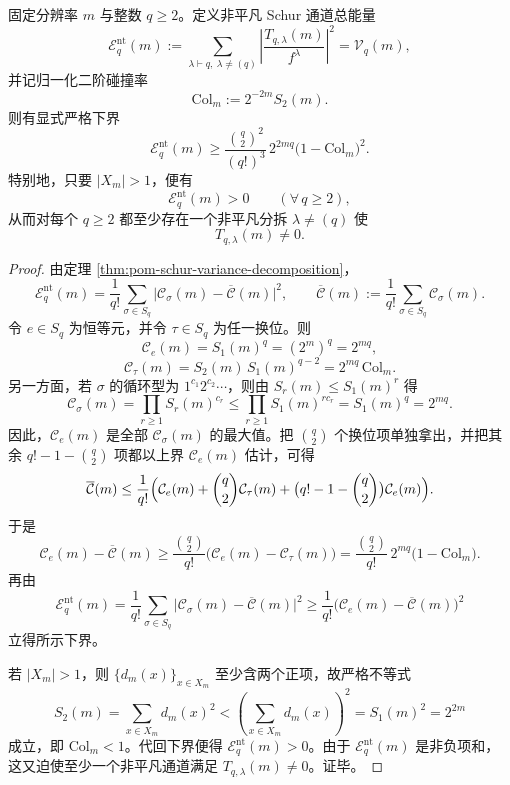 \begin{theorem}\label{thm:pom-schur-nontrivial-energy-explicit-lower-bound}
固定分辨率 \(m\) 与整数 \(q\ge 2\)。定义非平凡 Schur 通道总能量
\[
\mathcal E_q^{\mathrm{nt}}(m)
:=
\sum_{\lambda\vdash q,\ \lambda\neq(q)}
\left|\frac{T_{q,\lambda}(m)}{f^\lambda}\right|^2
=
\mathcal V_q(m),
\]
并记归一化二阶碰撞率
\[
\mathrm{Col}_m:=2^{-2m}S_2(m).
\]
则有显式严格下界
\[
\boxed{
\mathcal E_q^{\mathrm{nt}}(m)
\ge
\frac{\binom{q}{2}^2}{(q!)^3}\,2^{2mq}\bigl(1-\mathrm{Col}_m\bigr)^2.
}
\]
特别地，只要 \(|X_m|>1\)，便有
\[
\mathcal E_q^{\mathrm{nt}}(m)>0
\qquad(\forall\,q\ge 2),
\]
从而对每个 \(q\ge 2\) 都至少存在一个非平凡分拆 \(\lambda\neq(q)\) 使
\[
T_{q,\lambda}(m)\neq 0.
\]
\end{theorem}
\begin{proof}
由定理 \ref{thm:pom-schur-variance-decomposition}，
\[
\mathcal E_q^{\mathrm{nt}}(m)
=
\frac{1}{q!}\sum_{\sigma\in S_q}
\bigl|\mathcal C_\sigma(m)-\overline{\mathcal C}(m)\bigr|^2,
\qquad
\overline{\mathcal C}(m):=\frac{1}{q!}\sum_{\sigma\in S_q}\mathcal C_\sigma(m).
\]
令 \(e\in S_q\) 为恒等元，并令 \(\tau\in S_q\) 为任一换位。则
\[
\mathcal C_e(m)=S_1(m)^q=(2^m)^q=2^{mq},
\]
\[
\mathcal C_\tau(m)=S_2(m)\,S_1(m)^{q-2}=2^{mq}\,\mathrm{Col}_m.
\]
另一方面，若 \(\sigma\) 的循环型为 \(1^{c_1}2^{c_2}\cdots\)，则由 \(S_r(m)\le S_1(m)^r\) 得
\[
\mathcal C_\sigma(m)
=
\prod_{r\ge 1}S_r(m)^{c_r}
\le
\prod_{r\ge 1}S_1(m)^{r c_r}
=
S_1(m)^q
=
2^{mq}.
\]
因此，\(\mathcal C_e(m)\) 是全部 \(\mathcal C_\sigma(m)\) 的最大值。把 \(\binom{q}{2}\) 个换位项单独拿出，并把其余 \(q!-1-\binom{q}{2}\) 项都以上界 \(\mathcal C_e(m)\) 估计，可得
\[
\overline{\mathcal C}(m)
\le
\frac{1}{q!}
\Bigl(
\mathcal C_e(m)
+\binom{q}{2}\mathcal C_\tau(m)
+\bigl(q!-1-\binom{q}{2}\bigr)\mathcal C_e(m)
\Bigr).
\]
于是
\[
\mathcal C_e(m)-\overline{\mathcal C}(m)
\ge
\frac{\binom{q}{2}}{q!}
\bigl(\mathcal C_e(m)-\mathcal C_\tau(m)\bigr)
=
\frac{\binom{q}{2}}{q!}\,2^{mq}\bigl(1-\mathrm{Col}_m\bigr).
\]
再由
\[
\mathcal E_q^{\mathrm{nt}}(m)
=
\frac{1}{q!}\sum_{\sigma\in S_q}
\bigl|\mathcal C_\sigma(m)-\overline{\mathcal C}(m)\bigr|^2
\ge
\frac{1}{q!}\bigl(\mathcal C_e(m)-\overline{\mathcal C}(m)\bigr)^2
\]
立得所示下界。

若 \(|X_m|>1\)，则 \(\{d_m(x)\}_{x\in X_m}\) 至少含两个正项，故严格不等式
\[
S_2(m)=\sum_{x\in X_m}d_m(x)^2
<
\left(\sum_{x\in X_m}d_m(x)\right)^2
=
S_1(m)^2
=
2^{2m}
\]
成立，即 \(\mathrm{Col}_m<1\)。代回下界便得 \(\mathcal E_q^{\mathrm{nt}}(m)>0\)。由于 \(\mathcal E_q^{\mathrm{nt}}(m)\) 是非负项和，这又迫使至少一个非平凡通道满足 \(T_{q,\lambda}(m)\neq 0\)。证毕。
\end{proof}

